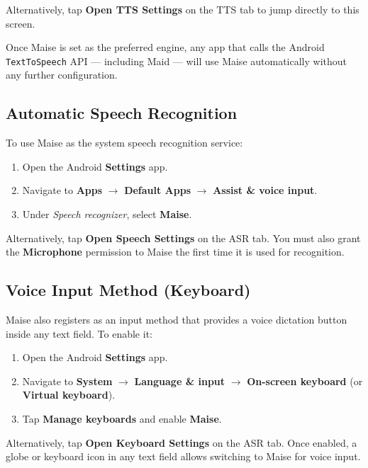 \documentclass[12pt,a4paper]{article}
\begin{document}
Alternatively, tap \textbf{Open TTS Settings} on the TTS tab to jump directly to this screen.

Once Maise is set as the preferred engine, any app that calls the Android \texttt{TextToSpeech} API — including Maid — will use Maise automatically without any further configuration.

\subsection{Automatic Speech Recognition}
\label{sec:setup-asr}

To use Maise as the system speech recognition service:

\begin{enumerate}
    \item Open the Android \textbf{Settings} app.
    \item Navigate to \textbf{Apps} $\rightarrow$ \textbf{Default Apps} $\rightarrow$ \textbf{Assist \& voice input}.
    \item Under \emph{Speech recognizer}, select \textbf{Maise}.
\end{enumerate}

Alternatively, tap \textbf{Open Speech Settings} on the ASR tab. You must also grant the \textbf{Microphone} permission to Maise the first time it is used for recognition.

\subsection{Voice Input Method (Keyboard)}
\label{sec:setup-ime}

Maise also registers as an input method that provides a voice dictation button inside any text field. To enable it:

\begin{enumerate}
    \item Open the Android \textbf{Settings} app.
    \item Navigate to \textbf{System} $\rightarrow$ \textbf{Language \& input} $\rightarrow$ \textbf{On-screen keyboard} (or \textbf{Virtual keyboard}).
    \item Tap \textbf{Manage keyboards} and enable \textbf{Maise}.
\end{enumerate}

Alternatively, tap \textbf{Open Keyboard Settings} on the ASR tab. Once enabled, a globe or keyboard icon in any text field allows switching to Maise for voice input.
\end{document}
